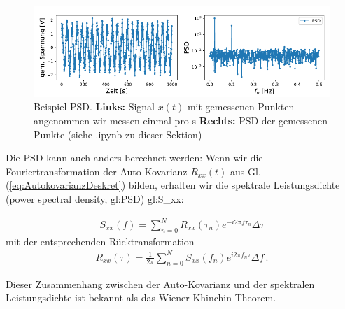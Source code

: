 
\begin{figure}[htbp]
    \centering
        \includegraphics[width=\textwidth]{Figures/psd_fig2.pdf}
        \caption{Beispiel PSD. \textbf{Links:} Signal $x(t)$ mit gemessenen Punkten angenommen wir messen einmal pro s  \textbf{Rechts:} PSD der gemessenen Punkte (siehe .ipynb zu dieser Sektion)}
        \label{fig:PSD}
\end{figure}

Die PSD kann auch anders berechnet werden: Wenn wir die Fouriertransformation der Auto-Kovarianz $R_{xx}(t)$ aus Gl. (\ref{eq:AutokovarianzDeskret}) bilden, erhalten wir die spektrale Leistungsdichte (power spectral density, \gls{gl:PSD}) \gls{gl:S_xx}:

\begin{align}
S_{xx} (f) = \sum_{n=0}^{N} R_{xx} (\tau_n) e^{-i 2 \pi f \tau_n}\Delta \tau
\label{eq:vl7-1}
\end{align}
mit der entsprechenden Rücktransformation
\begin{align}
R_{xx} (\tau) = \frac{1}{2 \pi} \sum_{n=0}^{N} S_{xx} (f_n) e^{i 2 \pi f_n \tau}\Delta f\,.
\label{eq:vl7-2}
\end{align}

\begin{center}
\begin{tcolorbox}[enhanced,width=6in,drop fuzzy shadow southwest,
    colframe=red!50!black,colback=red!05]
   Dieser Zusammenhang zwischen der Auto-Kovarianz und der spektralen Leistungsdichte ist bekannt als das Wiener-Khinchin Theorem.
\end{tcolorbox}
\end{center}

